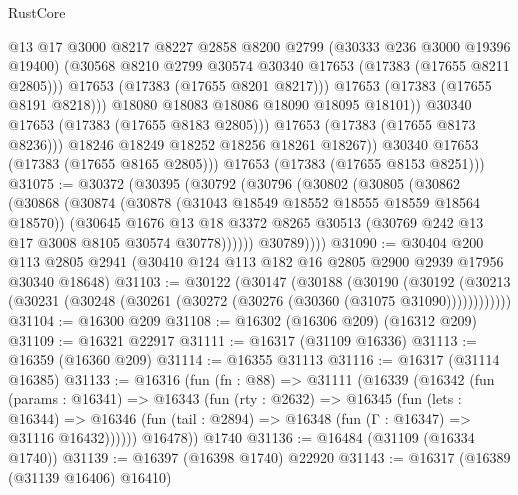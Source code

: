 \begin{lexlean}{RustCore}
\begin{coremodule}
                        @13
                        @17
                        @3000
                        @8217
                        @8227
                        @2858
                        @8200
                        @2799
                        (@30333 @236 @3000 @19396 @19400)
                        (@30568 @8210 @2799 @30574 @30340 @17653 (@17383 (@17655 @8211 @2805)))
                        @17653
                        (@17383 (@17655 @8201 @8217)))
                      @17653
                      (@17383 (@17655 @8191 @8218)))
                    @18080
                    @18083
                    @18086
                    @18090
                    @18095
                    @18101))
                @30340
                @17653
                (@17383 (@17655 @8183 @2805)))
              @17653
              (@17383 (@17655 @8173 @8236)))
            @18246
            @18249
            @18252
            @18256
            @18261
            @18267))
        @30340
        @17653
        (@17383 (@17655 @8165 @2805)))
      @17653
      (@17383 (@17655 @8153 @8251)))
@31075 := @30372
    (@30395
      (@30792
        (@30796
          (@30802
            (@30805
              (@30862
                (@30868
                  (@30874
                    (@30878 (@31043 @18549 @18552 @18555 @18559 @18564 @18570))
                    (@30645
                      @1676
                      @13
                      @18
                      @3372
                      @8265
                      @30513
                      (@30769 @242 @13 @17 @3008 @8105 @30574 @30778))))))
            @30789))))
@31090 := @30404
    @200
    @113
    @2805
    @2941
    (@30410 @124 @113 @182 @16 @2805 @2900 @2939 @17956 @30340 @18648)
@31103 := @30122
    (@30147
      (@30188
        (@30190
          (@30192 (@30213 (@30231 (@30248 (@30261 (@30272 (@30276 (@30360 (@31075 @31090))))))))))))
@31104 := @16300 @209
@31108 := @16302 (@16306 @209) (@16312 @209)
@31109 := @16321 @22917
@31111 := @16317 (@31109 @16336)
@31113 := @16359 (@16360 @209)
@31114 := @16355 @31113
@31116 := @16317 (@31114 @16385)
@31133 := @16316
    (fun (fn : @88) =>
    @31111
      (@16339
        (@16342
          (fun (params : @16341) =>
          @16343
            (fun (rty : @2632) =>
            @16345
              (fun (lets : @16344) =>
              @16346 (fun (tail : @2894) => @16348 (fun (Γ : @16347) => @31116 @16432))))))
        @16478))
    @1740
@31136 := @16484 (@31109 (@16334 @1740))
@31139 := @16397 (@16398 @1740) @22920
@31143 := @16317 (@16389 (@31139 @16406) @16410)

\end{coremodule}
\end{lexlean}
